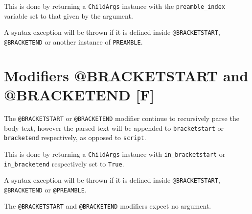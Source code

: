 This is done by returning a \verb|ChildArgs| instance with the \verb|preamble_index| variable set to that given by the argument. 

A syntax exception will be thrown if it is defined inside \verb|@BRACKETSTART|, \verb|@BRACKETEND| or another instance of \verb|PREAMBLE|.

\section{Modifiers @BRACKETSTART and @BRACKETEND [F]}

The \verb|@BRACKETSTART| or \verb|@BRACKETEND| modifier continue to recursively parse the body text, however the parsed text will be appended to \verb|bracketstart| or \verb|bracketend| respectively, as opposed to \verb|script|. 


This is done by returning a \verb|ChildArgs| instance with \verb|in_bracketstart| or \\\verb|in_bracketend| respectively set to \verb|True|.

A syntax exception will be thrown if it is defined inside \verb|@BRACKETSTART|, \verb|@BRACKETEND| or \verb|@PREAMBLE|.

The \verb|@BRACKETSTART| and \verb|@BRACKETEND| modifiers expect no argument.
